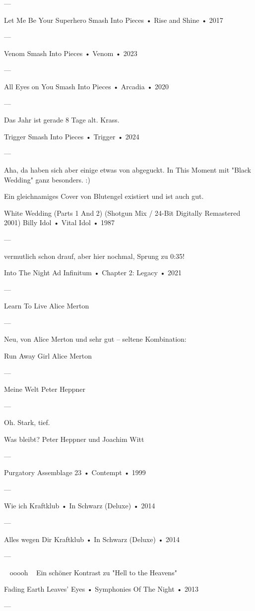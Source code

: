 —

Let Me Be Your Superhero
Smash Into Pieces
 •
Rise and Shine
 •
2017

—

Venom
Smash Into Pieces
 •
Venom
 •
2023

—

All Eyes on You
Smash Into Pieces
 •
Arcadia
 •
2020

—

Das Jahr ist gerade 8 Tage alt. Krass.

Trigger
Smash Into Pieces
 •
Trigger
 •
2024

—

Aha, da haben sich aber einige etwas von abgeguckt. In This Moment mit "Black Wedding" ganz besonders. :)

Ein gleichnamiges Cover von Blutengel existiert und ist auch gut.

White Wedding (Parts 1 And 2) (Shotgun Mix / 24-Bit Digitally Remastered 2001)
Billy Idol
 •
Vital Idol
 • 1987

—

vermutlich schon drauf, aber hier nochmal, Sprung zu 0:35!

Into The Night
Ad Infinitum
 •
Chapter 2: Legacy
 • 2021

—

Learn To Live
Alice Merton

—

Neu, von Alice Merton und sehr gut – seltene Kombination:

Run Away Girl
Alice Merton

—

Meine Welt
Peter Heppner

—

Oh. Stark, tief.

Was bleibt?
Peter Heppner und Joachim Witt

—

Purgatory
Assemblage 23
 •
Contempt
 •
1999

—

Wie ich
Kraftklub
 •
In Schwarz (Deluxe)
 •
2014

—

Alles wegen Dir
Kraftklub
 •
In Schwarz (Deluxe)
 •
2014

—

~ ooooh ~ Ein schöner Kontrast zu "Hell to the Heavens" ~

Fading Earth
Leaves' Eyes
 •
Symphonies Of The Night
 •
2013


—

